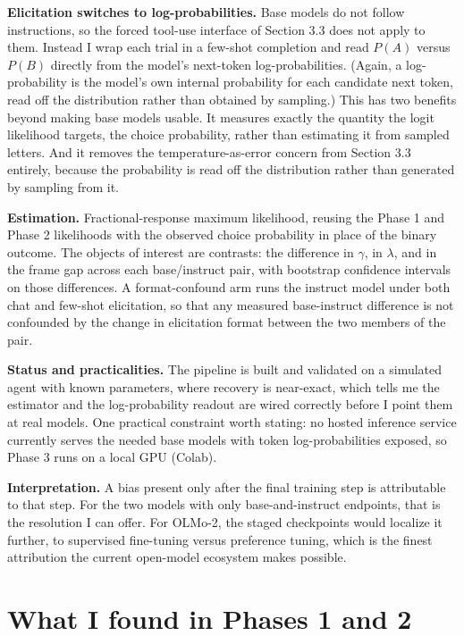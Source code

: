 \documentclass[11pt]{article}
\begin{document}
\textbf{Elicitation switches to log-probabilities.} Base models do not follow instructions, so the forced
tool-use interface of Section 3.3 does not apply to them. Instead I wrap each trial in a few-shot
completion and read $P(A)$ versus $P(B)$ directly from the model's next-token log-probabilities. (Again, a
log-probability is the model's own internal probability for each candidate next token, read off the
distribution rather than obtained by sampling.) This has two benefits beyond making base models usable. It
measures exactly the quantity the logit likelihood targets, the choice probability, rather than estimating
it from sampled letters. And it removes the temperature-as-error concern from Section 3.3 entirely,
because the probability is read off the distribution rather than generated by sampling from it.

\textbf{Estimation.} Fractional-response maximum likelihood, reusing the Phase 1 and Phase 2 likelihoods
with the observed choice probability in place of the binary outcome. The objects of interest are
contrasts: the difference in $\gamma$, in $\lambda$, and in the frame gap across each base/instruct pair,
with bootstrap confidence intervals on those differences. A format-confound arm runs the instruct model
under both chat and few-shot elicitation, so that any measured base-instruct difference is not confounded
by the change in elicitation format between the two members of the pair.

\textbf{Status and practicalities.} The pipeline is built and validated on a simulated agent with known
parameters, where recovery is near-exact, which tells me the estimator and the log-probability readout are
wired correctly before I point them at real models. One practical constraint worth stating: no hosted
inference service currently serves the needed base models with token log-probabilities exposed, so Phase 3
runs on a local GPU (Colab).

\textbf{Interpretation.} A bias present only after the final training step is attributable to that step.
For the two models with only base-and-instruct endpoints, that is the resolution I can offer. For OLMo-2,
the staged checkpoints would localize it further, to supervised fine-tuning versus preference tuning,
which is the finest attribution the current open-model ecosystem makes possible.

\section{What I found in Phases 1 and 2}
\end{document}
